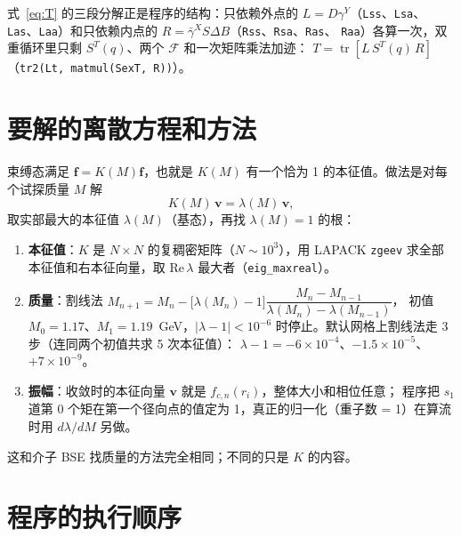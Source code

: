\documentclass[11pt,a4paper]{ctexart}
\newcommand{\tr}{\operatorname{tr}}
\newcommand{\code}[1]{\texttt{#1}}
\begin{document}
式~\eqref{eq:T} 的三段分解正是程序的结构：只依赖外点的 $L=D\gamma^Y$（\code{Lss}、\code{Lsa}、
\code{Las}、\code{Laa}）和只依赖内点的 $R=\bar\gamma^XS\Delta B$（\code{Rss}、\code{Rsa}、\code{Ras}、
\code{Raa}）各算一次，双重循环里只剩 $S^T(q)$、两个 $\mathcal F$ 和一次矩阵乘法加迹：
$T=\tr[L\,S^T(q)\,R]$（\code{tr2(Lt, matmul(SexT, R))}）。

\section{要解的离散方程和方法}

束缚态满足 $\boldsymbol f=K(M)\boldsymbol f$，也就是 $K(M)$ 有一个恰为 1 的本征值。做法是对每个试探质量 $M$ 解
\begin{equation}\label{eq:eig}
K(M)\,\boldsymbol v=\lambda(M)\,\boldsymbol v ,
\end{equation}
取实部最大的本征值 $\lambda(M)$（基态），再找 $\lambda(M)=1$ 的根：
\begin{enumerate}
\item \textbf{本征值}：$K$ 是 $N\times N$ 的复稠密矩阵（$N\sim10^3$），用 LAPACK \code{zgeev}
求全部本征值和右本征向量，取 $\mathrm{Re}\,\lambda$ 最大者（\code{eig\_maxreal}）。
\item \textbf{质量}：割线法
$M_{n+1}=M_n-\big[\lambda(M_n)-1\big]\dfrac{M_n-M_{n-1}}{\lambda(M_n)-\lambda(M_{n-1})}$，
初值 $M_0=1.17$、$M_1=1.19$~GeV，$|\lambda-1|<10^{-6}$ 时停止。默认网格上割线法走 3 步（连同两个初值共求 5 次本征值）：
$\lambda-1=-6\times10^{-4}$、$-1.5\times10^{-5}$、$+7\times10^{-9}$。
\item \textbf{振幅}：收敛时的本征向量 $\boldsymbol v$ 就是 $f_{c,n}(r_i)$，整体大小和相位任意；
程序把 $s_1$ 道第 0 个矩在第一个径向点的值定为 1，真正的归一化（重子数 = 1）在算流时用
$d\lambda/dM$ 另做。
\end{enumerate}
这和介子 BSE 找质量的方法完全相同；不同的只是 $K$ 的内容。

\section{程序的执行顺序}
\end{document}
